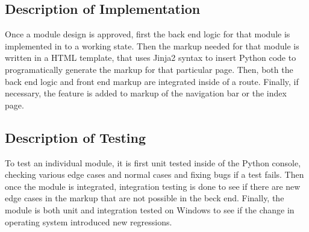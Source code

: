 \documentclass[12pt]{article}
\begin{document}
\subsection{Description of Implementation}
Once a module design is approved, first the back end logic for that module is implemented in to a working state. Then the markup needed for that module is written in a HTML template, that uses Jinja2 syntax to insert Python code to programatically generate the markup for that particular page. Then, both the back end logic and front end markup are integrated inside of a route. Finally, if necessary, the feature is added to markup of the navigation bar or the index page.
\subsection{Description of Testing}
To test an individual module, it is first unit tested inside of the Python console, checking various edge cases and normal cases and fixing bugs if a test fails. Then once the module is integrated, integration testing is done to see if there are new edge cases in the markup that are not possible in the beck end. Finally, the module is both unit and integration tested on Windows to see if the change in operating system introduced new regressions.
\end{document}
